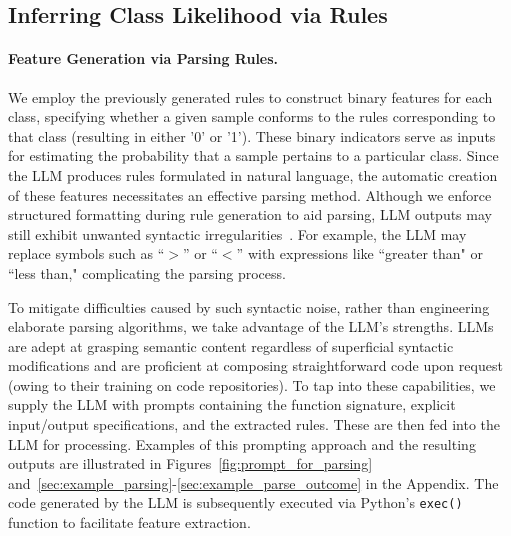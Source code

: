 \subsection{Inferring Class Likelihood via Rules}
\label{Sec:training}

\paragraph{Feature Generation via Parsing Rules.} We employ the previously generated rules to construct binary features for each class, specifying whether a given sample conforms to the rules corresponding to that class (resulting in either '0' or '1'). These binary indicators serve as inputs for estimating the probability that a sample pertains to a particular class. Since the LLM produces rules formulated in natural language, the automatic creation of these features necessitates an effective parsing method. Although we enforce structured formatting during rule generation to aid parsing, LLM outputs may still exhibit unwanted syntactic irregularities~\cite{kovavc2023large}. For example, the LLM may replace symbols such as ``$>$” or ``$<$” with expressions like ``greater than" or ``less than," complicating the parsing process.

To mitigate difficulties caused by such syntactic noise, rather than engineering elaborate parsing algorithms, we take advantage of the LLM's strengths. LLMs are adept at grasping semantic content regardless of superficial syntactic modifications and are proficient at composing straightforward code upon request (owing to their training on code repositories). To tap into these capabilities, we supply the LLM with prompts containing the function signature, explicit input/output specifications, and the extracted rules. These are then fed into the LLM for processing. Examples of this prompting approach and the resulting outputs are illustrated in Figures~\ref{fig:prompt_for_parsing} and~\ref{sec:example_parsing}-\ref{sec:example_parse_outcome} in the Appendix. The code generated by the LLM is subsequently executed via Python’s \texttt{exec()} function to facilitate feature extraction.

\vspace*{-0.12in}
